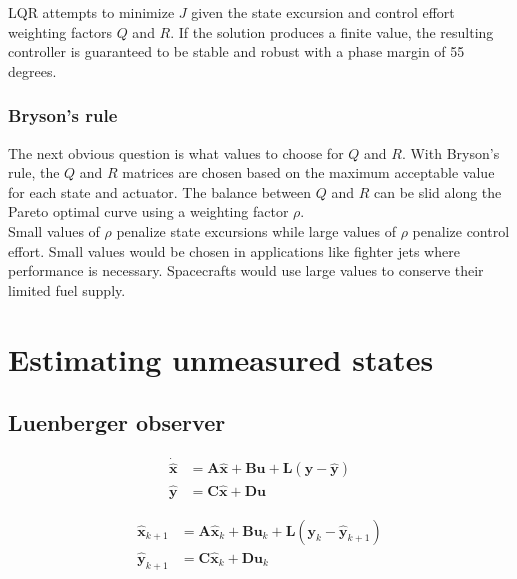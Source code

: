 \documentclass[10pt,conference,compsoc]{IEEEtran}
\newcommand{\mtx}[1] {\bm #1}
\begin{document}
\noindent LQR attempts to minimize $J$ given the state excursion and control
effort weighting factors $Q$ and $R$. If the solution produces a finite value,
the resulting controller is guaranteed to be stable and robust with a phase
margin of 55 degrees.

\subsubsection{Bryson's rule}

\noindent The next obvious question is what values to choose for $Q$ and $R$.
With Bryson's rule, the $Q$ and $R$ matrices are chosen based on the maximum
acceptable value for each state and actuator. The balance between $Q$ and $R$
can be slid along the Pareto optimal curve using a weighting factor $\rho$. \\

\noindent Small values of $\rho$ penalize state excursions while large values of
$\rho$ penalize control effort. Small values would be chosen in applications
like fighter jets where performance is necessary. Spacecrafts would use large
values to conserve their limited fuel supply.

\section{Estimating unmeasured states}

\subsection{Luenberger observer}

\begin{align}
  \dot{\hat{\mtx{x}}} &= \mtx{A}\hat{\mtx{x}} + \mtx{B}\mtx{u} +
    \mtx{L} (\mtx{y} - \hat{\mtx{y}}) \label{eq:s_obsv_x} \\
  \hat{\mtx{y}} &= \mtx{C}\hat{\mtx{x}} + \mtx{D}\mtx{u} \label{eq:s_obsv_y}
\end{align}

\begin{align}
  \hat{\mtx{x}}_{k+1} &= \mtx{A}\hat{\mtx{x}}_k + \mtx{B}\mtx{u}_k +
    \mtx{L} (\mtx{y}_k - \hat{\mtx{y}}_{k+1}) \label{eq:z_obsv_x} \\
  \hat{\mtx{y}}_{k+1} &= \mtx{C}\hat{\mtx{x}}_k +
    \mtx{D}\mtx{u}_k \label{eq:z_obsv_y} \\ \nonumber
\end{align}
\end{document}

